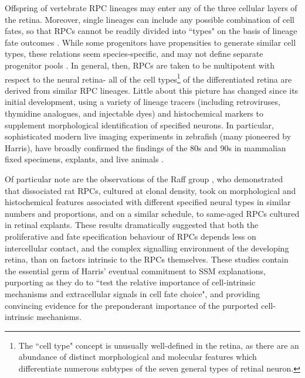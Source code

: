 \documentclass{ut-thesis}
\begin{document}
\begin{NoHyper}
Offspring of vertebrate RPC lineages may enter any of the three cellular layers of the retina. Moreover, single lineages can include any possible combination of cell fates, so that RPCs cannot be readily divided into ``types" on the basis of lineage fate outcomes \cite{Holt1988,Turner1990,Wetts1988}. While some progenitors have propensities to generate similar cell types, these relations seem species-specific, and may not define separate progenitor pools \cite{Adler2008}. In general, then, RPCs are taken to be multipotent with respect to the neural retina- all of the cell types\footnote{The ``cell type" concept is unusually well-defined in the retina, as there are an abundance of distinct morphological and molecular features which differentiate numerous subtypes of the seven general types of retinal neuron.} of the differentiated retina are derived from similar RPC lineages. Little about this picture has changed since its initial development, using a variety of lineage tracers (including retroviruses, thymidine analogues, and injectable dyes) and histochemical markers to supplement morphological identification of specified neurons. In particular, sophisticated modern live imaging experiments in zebrafish (many pioneered by Harris), have broadly confirmed the findings of the 80s and 90s in mammalian fixed specimens, explants, and live animals \cite{Boije2015}.

\label{Raff}
Of particular note are the observations of the Raff group \cite{Watanabe1990,Cayouette2003}, who demonstrated that dissociated rat RPCs, cultured at clonal density, took on morphological and histochemical features associated with different specified neural types in similar numbers and proportions, and on a similar schedule, to same-aged RPCs cultured in retinal explants. These results dramatically suggested that both the proliferative and fate specification behaviour of RPCs depends less on intercellular contact, and the complex signalling environment of the developing retina, than on factors intrinsic to the RPCs themselves. These studies contain the essential germ of Harris' eventual commitment to SSM explanations, purporting as they do to ``test the relative importance of cell-intrinsic mechanisms and extracellular signals in cell fate choice", and providing convincing evidence for the preponderant importance of the purported cell-intrinsic mechanisms.


\end{NoHyper}
\end{document}
